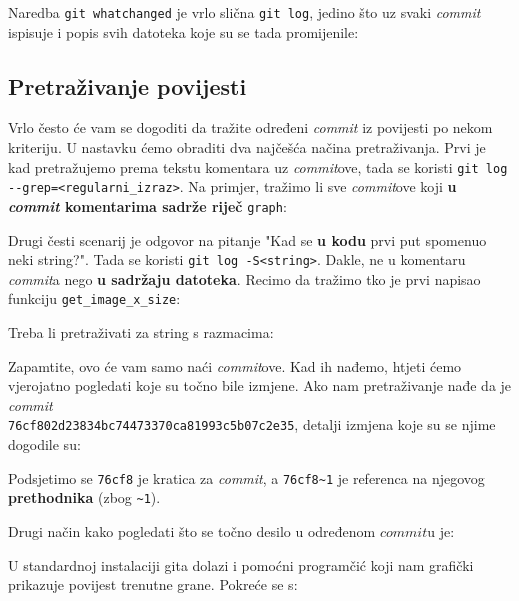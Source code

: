 Naredba \verb+git whatchanged+ je vrlo slična \verb+git log+, jedino što uz svaki \emph{commit} ispisuje i popis svih datoteka koje su se tada promijenile:



\subsection*{Pretraživanje povijesti}

Vrlo često će vam se dogoditi da tražite određeni \emph{commit} iz povijesti po nekom kriteriju.
U nastavku ćemo obraditi dva najčešća načina pretraživanja.
Prvi je kad pretražujemo prema tekstu komentara uz \emph{commit}ove, tada se koristi \verb+git log --grep=<regularni_izraz>+.
Na primjer, tražimo li sve \emph{commit}ove koji \textbf{u \emph{commit} komentarima sadrže riječ} \verb+graph+:


Drugi česti scenarij je odgovor na pitanje "Kad se \textbf{u kodu} prvi put spomenuo neki string?". Tada se koristi \verb+git log -S<string>+.
Dakle, ne u komentaru \emph{commit}a nego \textbf{u sadržaju datoteka}.
Recimo da tražimo tko je prvi napisao funkciju \verb+get_image_x_size+:


Treba li pretraživati za string s razmacima:


Zapamtite, ovo će vam samo naći \emph{commit}ove.
Kad ih nađemo, htjeti ćemo vjerojatno pogledati koje su točno bile izmjene.
Ako nam pretraživanje nađe da je \emph{commit} \\ \verb+76cf802d23834bc74473370ca81993c5b07c2e35+, detalji izmjena koje su se njime dogodile su:


Podsjetimo se \verb+76cf8+ je kratica za \emph{commit}, a \verb+76cf8~1+ je referenca na njegovog \textbf{prethodnika} (zbog \verb+~1+).

Drugi način kako pogledati što se točno desilo u određenom $commit$u je:



U standardnoj instalaciji gita dolazi i pomoćni programčić koji nam grafički prikazuje povijest trenutne grane.
Pokreće se s:

